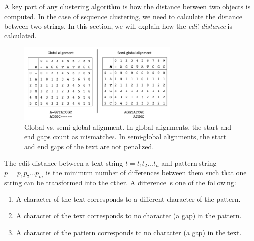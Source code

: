 A key part of any clustering algorithm is how the distance between two objects is computed.
In the case of sequence clustering, we need to calculate the distance between two strings.
In this section, we will explain how the \emph{edit distance} is calculated. 

\begin{figure}[b!]
  \centering
    \includegraphics[width=0.7\textwidth]{global_semiglobal}
  \caption{Global vs. semi-global alignment.  In global alignments, the start and end gaps count as mismatches.  In semi-global alignments, the start and end gaps of the text are not penalized.}
  \label{fig:global_vs_semiglobal}
\end{figure}


\begin{definition}
The edit distance between a text string $t = t_1 t_2 ... t_n$ and pattern string $p = p_1 p_2  ... p_m$ is the minimum number of differences between them such that one string can be transformed into the other.
A difference is one of the following:
\begin{enumerate}

  \item A character of the text corresponds to a different character of the pattern.
  \item A character of the text corresponds to no character (a gap) in the pattern.
  \item A character of the pattern corresponds to no character (a gap) in the text.

\end{enumerate}
\end{definition}

